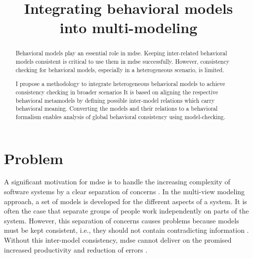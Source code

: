 \documentclass[conference]{IEEEtran}
\begin{document}
\title{Integrating behavioral models\\ into multi-modeling}

\author{
}


\maketitle

\begin{abstract}
Behavioral models play an essential role in \gls{mdse}.
Keeping inter-related behavioral models consistent is critical to use them in \gls{mdse} successfully. 
However, consistency checking for behavioral models, especially in a heterogeneous scenario, is limited.

I propose a methodology to integrate heterogeneous behavioral models to achieve consistency checking in broader scenarios
It is based on aligning the respective behavioral metamodels by defining possible inter-model relations which carry behavioral meaning.
Converting the models and their relations to a behavioral formalism enables analysis of global behavioral consistency using model-checking. 
\end{abstract}


\IEEEpeerreviewmaketitle



\section{Problem}
A significant motivation for \gls{mdse} is to handle the increasing complexity of software systems by a clear separation of concerns \cite{franceModeldrivenDevelopmentComplex2007}.
In the multi-view modeling approach, a set of models is developed for the different aspects of a system.
It is often the case that separate groups of people work independently on parts of the system.
However, this separation of concerns causes problems because models must be kept consistent, i.e., they should not contain contradicting information \cite{cicchettiMultiviewApproachesSoftware2019}.
Without this inter-model consistency, \gls{mdse} cannot deliver on the promised increased productivity and reduction of errors \cite{brambillaModeldrivenSoftwareEngineering2017}.
\end{document}

